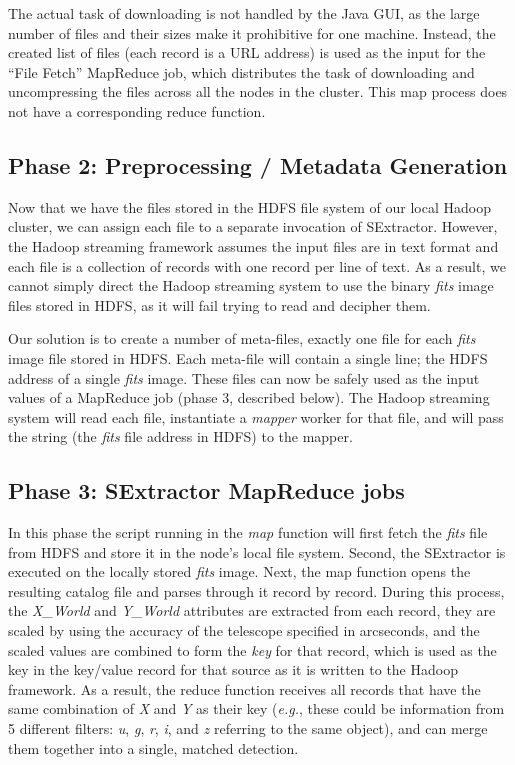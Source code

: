 The actual task of downloading is not handled by the Java GUI, as the large number of files and their sizes make it prohibitive for one machine. Instead, the created list of files (each record is a URL address) is used as the input for the ``File Fetch'' MapReduce job, which distributes the task of downloading and uncompressing the files across all the nodes in the cluster. 
This map process does not have a corresponding reduce function.

\subsection{Phase 2: Preprocessing / Metadata Generation}
Now that we have the files stored in the HDFS file system of our local Hadoop cluster, we can assign each file to a separate invocation of SExtractor. However, the Hadoop streaming framework assumes the input files are in text format and each file is a collection of records with one record per line of text. As a result, we cannot simply direct the Hadoop streaming system to use the binary \textit{fits} image files stored in HDFS, as it will fail trying to read and decipher them.

Our solution is to create a number of meta-files, exactly one file for each \textit{fits} image file stored in HDFS. Each meta-file will contain a single line; the HDFS address of a single \textit{fits} image. 
These files can now be safely used as the input values of a MapReduce job (phase 3, described below). The Hadoop streaming system will read each file, instantiate a \textit{mapper} worker for that file, and will pass the string (the \textit{fits} file address in HDFS) to the mapper. 

\subsection{Phase 3: SExtractor MapReduce jobs}
In this phase the script running in the \textit{map} function will first fetch the \textit{fits} file from HDFS and store it in the node's local file system. Second, the SExtractor is executed on the locally stored \textit{fits} image. Next, the map function opens the resulting catalog file and parses through it record by record. During this process, the \textit{X\_World} and \textit{Y\_World} attributes are extracted from each record, they are scaled by using the accuracy of the telescope specified in arcseconds, and the scaled values are combined to form the \textit{key} for that record, which is used as the key in the key/value record for that source as it is written to the Hadoop framework. As a result, the reduce function 
receives all  records that have the same combination of \textit{X} and \textit{Y} as their key (\textit{e.g.}, these could be information from 5 different filters: \textit{u}, \textit{g}, \textit{r}, \textit{i}, and \textit{z} referring to the same object), and can merge them together into a single, matched detection.

